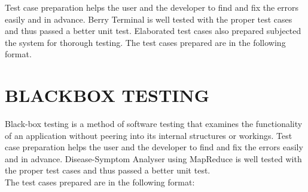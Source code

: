 \documentclass[12pt,a4paper,oneside]{report}
\begin{document}
\par Test case preparation helps the user and the developer to ﬁnd and ﬁx the errors easily and in advance. Berry Terminal is well tested with the proper test cases and thus passed a better unit test. Elaborated test cases also prepared subjected the system for thorough testing. The test cases prepared are in the following format.\\


\section{BLACKBOX TESTING}
\par Black-box testing is a method of software testing that examines the functionality of an application without peering into its internal structures or workings. Test case preparation helps the user and the developer to ﬁnd and ﬁx the errors easily and in advance. Disease-Symptom Analyser using MapReduce is well tested with the proper test cases and thus passed a better unit test.\\
 The test cases prepared are in the following format:\\
 \\
\end{document}
